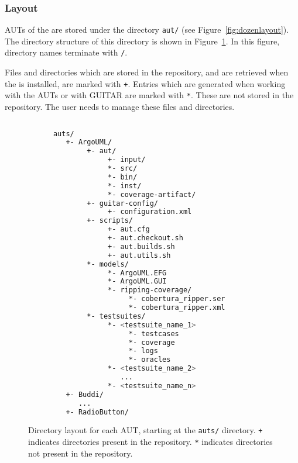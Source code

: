 %
%
\subsubsection{Layout}
\label{sec:autlayout}

AUTs of the \mddozen{} are stored under the directory \texttt{aut/} (see Figure~\ref{fig:dozenlayout}). The directory structure of this directory is shown in Figure~\ref{fig:autlayout}. In this figure, directory names terminate with \texttt{/}.

Files and directories which are stored in the \mddozen{} repository, and are retrieved when the \mddozen{} is installed, are marked with \texttt{+}. Entries which are generated when working with the AUTs or with GUITAR are marked with \texttt{*}. These are not stored in the repository. The user needs to manage these files and directories.

\begin{figure}
\scriptsize{
   \begin{lstlisting}[language=sh, showstringspaces=false, breaklines=true]
   
      auts/
         +- ArgoUML/
              +- aut/
                   +- input/
                   *- src/
                   *- bin/
                   *- inst/
                   *- coverage-artifact/
              +- guitar-config/
                   +- configuration.xml
              +- scripts/
                   +- aut.cfg
                   +- aut.checkout.sh
                   +- aut.builds.sh
                   +- aut.utils.sh
              *- models/
                   *- ArgoUML.EFG
                   *- ArgoUML.GUI
                   *- ripping-coverage/
                        *- cobertura_ripper.ser
                        *- cobertura_ripper.xml
              *- testsuites/
                   *- <testsuite_name_1>
                        *- testcases
                        *- coverage
                        *- logs
                        *- oracles
                   *- <testsuite_name_2>
                      ...
                   *- <testsuite_name_n>
         +- Buddi/
            ...
         +- RadioButton/
   \end{lstlisting}
}

   \caption{Directory layout for each AUT, starting at the \texttt{auts/} directory. \texttt{+} indicates directories present in the \mddozen{} repository. \texttt{*} indicates directories not present in the repository.}
   \label{fig:autlayout}
\end{figure}


